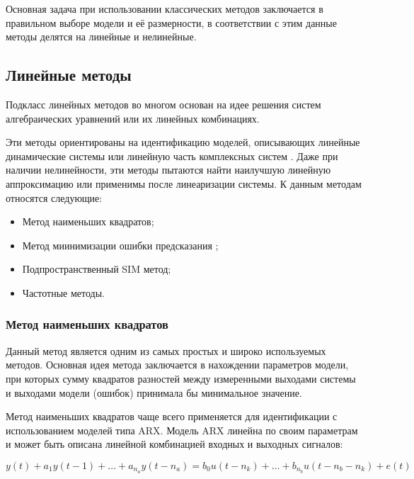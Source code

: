 Основная задача при использовании классических методов заключается в правильном
выборе модели и её размерности, в соответствии с этим данные методы делятся на
линейные и нелинейные.

\subsection{Линейные методы}

Подкласс линейных методов во многом основан на идее решения систем
алгебраических уравнений или их линейных комбинациях. 

Эти методы ориентированы на идентификацию моделей, описывающих линейные
динамические системы или линейную часть комплексных систем
\cite{bib:ident:linear}. Даже при наличии нелинейности, эти методы пытаются
найти наилучшую линейную аппроксимацию или применимы после линеаризации системы.
К данным методам относятся следующие:
\begin{itemize}
  \item Метод наименьших квадратов;
  \item Метод миинимизации ошибки предсказания ;
  \item Подпространственный SIM метод;
  \item Частотные методы.
\end{itemize}

\subsubsection{Метод наименьших квадратов}

Данный метод является одним из самых простых и широко используемых методов.
Основная идея метода заключается в нахождении параметров модели, при которых
сумму квадратов разностей между измеренными выходами системы и выходами модели
(ошибок) принимала бы минимальное значение.

Метод наименьших квадратов чаще всего применяется для идентификации с
использованием моделей типа ARX. Модель ARX линейна по своим параметрам и может
быть описана линейной комбинацией входных и выходных сигналов:

\begin{equation}
  y(t)+a_1y(t-1)+\dots+a_{n_a}y(t-n_a)=b_0u(t-n_k)+\dots+b_{n_b}u(t-n_b-n_k)+e(t)
  \label{eq:arx}
\end{equation}

